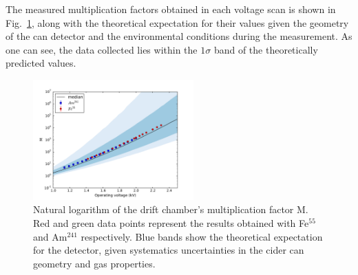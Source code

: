 



The measured multiplication factors obtained in each voltage scan is shown in Fig.~\ref{final_lnm}, along with the theoretical expectation for their values given the geometry of the can detector and the environmental conditions during the measurement. As one can see, the data collected lies within the $1\sigma$ band of the theoretically predicted values.

\begin{figure}[htb]
  \includegraphics[width=0.55\textwidth]{graphics/lnM_final_plot_new.pdf}
  \caption{Natural logarithm of the drift chamber's multiplication factor M. Red and green data points represent the results obtained with Fe$^{55}$ and Am$^{241}$ respectively. Blue bands show the theoretical expectation for the detector, given systematics uncertainties in the cider can geometry and gas properties.}
  \label{final_lnm}
\end{figure}

\FloatBarrier